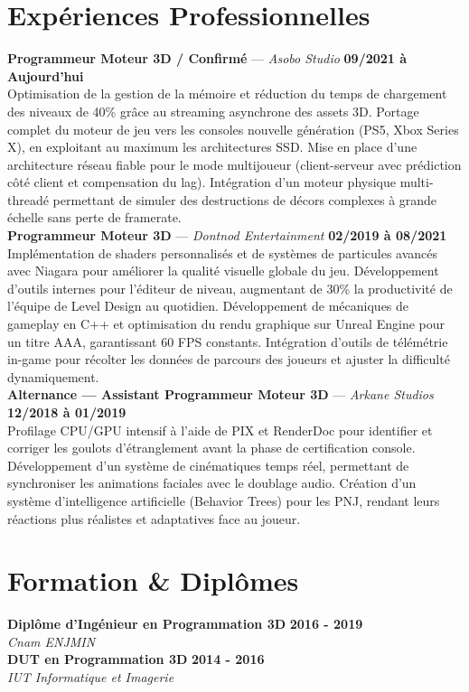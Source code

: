 \documentclass[11pt,a4paper]{article}
\begin{document}
\section*{Expériences Professionnelles}
\noindent \textbf{Programmeur Moteur 3D / Confirmé} --- \textit{Asobo Studio} \hfill \textbf{09/2021 à Aujourd'hui} \\
Optimisation de la gestion de la mémoire et réduction du temps de chargement des niveaux de 40\% grâce au streaming asynchrone des assets 3D. Portage complet du moteur de jeu vers les consoles nouvelle génération (PS5, Xbox Series X), en exploitant au maximum les architectures SSD. Mise en place d'une architecture réseau fiable pour le mode multijoueur (client-serveur avec prédiction côté client et compensation du lag). Intégration d'un moteur physique multi-threadé permettant de simuler des destructions de décors complexes à grande échelle sans perte de framerate. \\[0.3cm]
\noindent \textbf{Programmeur Moteur 3D} --- \textit{Dontnod Entertainment} \hfill \textbf{02/2019 à 08/2021} \\
Implémentation de shaders personnalisés et de systèmes de particules avancés avec Niagara pour améliorer la qualité visuelle globale du jeu. Développement d'outils internes pour l'éditeur de niveau, augmentant de 30\% la productivité de l'équipe de Level Design au quotidien. Développement de mécaniques de gameplay en C++ et optimisation du rendu graphique sur Unreal Engine pour un titre AAA, garantissant 60 FPS constants. Intégration d'outils de télémétrie in-game pour récolter les données de parcours des joueurs et ajuster la difficulté dynamiquement. \\[0.3cm]
\noindent \textbf{Alternance — Assistant Programmeur Moteur 3D} --- \textit{Arkane Studios} \hfill \textbf{12/2018 à 01/2019} \\
Profilage CPU/GPU intensif à l'aide de PIX et RenderDoc pour identifier et corriger les goulots d'étranglement avant la phase de certification console. Développement d'un système de cinématiques temps réel, permettant de synchroniser les animations faciales avec le doublage audio. Création d'un système d'intelligence artificielle (Behavior Trees) pour les PNJ, rendant leurs réactions plus réalistes et adaptatives face au joueur. \\[0.3cm]


\vspace{0.3cm}

\section*{Formation \& Diplômes}
\noindent \textbf{Diplôme d'Ingénieur en Programmation 3D} \hfill \textbf{2016 - 2019} \\
\textit{Cnam ENJMIN} \\[0.3cm]
\noindent \textbf{DUT en Programmation 3D} \hfill \textbf{2014 - 2016} \\
\textit{IUT Informatique et Imagerie} \\[0.3cm]
\end{document}
